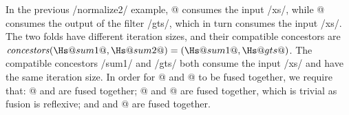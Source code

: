 In the previous \Hs/normalize2/ example, @ consumes the input \Hs/xs/, while @ consumes the output of the filter \Hs/gts/, which in turn consumes the input \Hs/xs/.
The two folds have different iteration sizes, and their compatible concestors are $\concestors(\Hs@sum1@, \Hs@sum2@) = (\Hs@sum1@, \Hs@gts@)$.
The compatible concestors \Hs/sum1/ and \Hs/gts/ both consume the input \Hs/xs/ and have the same iteration size.
In order for @ and @ to be fused together, we require that: @ and \Hs@gts@ are fused together; @ and @ are fused together, which is trivial as fusion is reflexive;  and \Hs@gts@ and @ are fused together.
